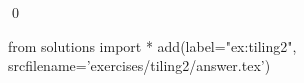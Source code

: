 
\begin{ex} 
  \label{ex:tiling2}
  
  \qed
\end{ex} 
\begin{python0}
from solutions import *
add(label="ex:tiling2",
    srcfilename='exercises/tiling2/answer.tex') 
\end{python0}
